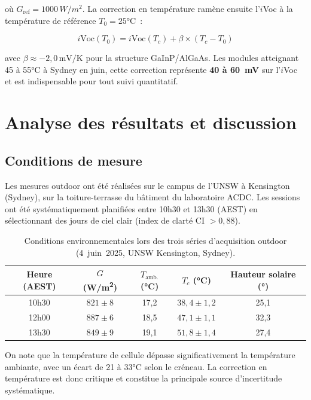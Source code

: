 \documentclass[12pt,a4paper]{report}
\begin{document}
où $G_\text{ref} = 1000\,\si{W/m^2}$. La correction en température ramène ensuite l'$i$Voc à la température de référence $T_0 = 25$°C~:

\begin{equation}
i\text{Voc}(T_0) = i\text{Voc}(T_c) + \beta \times (T_c - T_0)
\label{eq:correction_T}
\end{equation}

avec $\beta \approx -2{,}0\,\text{mV/K}$ pour la structure GaInP/AlGaAs. Les modules atteignant 45 à 55°C à Sydney en juin, cette correction représente \textbf{40 à 60~mV} sur l'$i$Voc et est indispensable pour tout suivi quantitatif.

\section{Analyse des résultats et discussion}

\subsection{Conditions de mesure}

Les mesures outdoor ont été réalisées sur le campus de l'UNSW à Kensington (Sydney), sur la toiture-terrasse du bâtiment du laboratoire ACDC. Les sessions ont été systématiquement planifiées entre 10h30 et 13h30 (AEST) en sélectionnant des jours de ciel clair (index de clarté CI $> 0{,}88$).

\begin{table}[H]
\centering
\caption{Conditions environnementales lors des trois séries d'acquisition outdoor (4~juin~2025, UNSW Kensington, Sydney).}
\label{tab:conditions}
\begin{tabular}{ccccc}
\toprule
Heure (AEST) & $G$ (\si{W/m^2}) & $T_\text{amb.}$ (°C) & $T_c$ (°C) & Hauteur solaire (°) \\
\midrule
10h30 & $821 \pm 8$  & 17,2 & $38{,}4 \pm 1{,}2$ & 25,1 \\
12h00 & $887 \pm 6$  & 18,5 & $47{,}1 \pm 1{,}1$ & 32,3 \\
13h30 & $849 \pm 9$  & 19,1 & $51{,}8 \pm 1{,}4$ & 27,4 \\
\bottomrule
\end{tabular}
\end{table}

\noindent
On note que la température de cellule dépasse significativement la température ambiante, avec un écart de 21 à 33°C selon le créneau. La correction en température est donc critique et constitue la principale source d'incertitude systématique.
\end{document}
